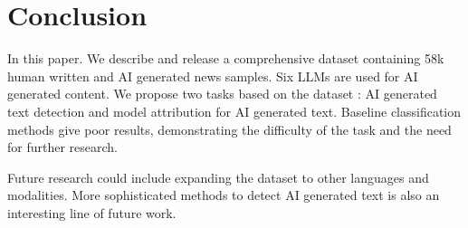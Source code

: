 \section{Conclusion}
In this paper. We describe and release a comprehensive dataset containing 58k human written and AI generated news samples. Six LLMs are used for AI generated content. We propose two tasks based on the dataset : AI generated text detection and model attribution for AI generated text.  Baseline classification methods give poor results, demonstrating the difficulty of the task and the need for further research.  

Future research could include expanding the dataset to other languages and modalities. More sophisticated methods to detect AI generated text is also an interesting line of future work. 